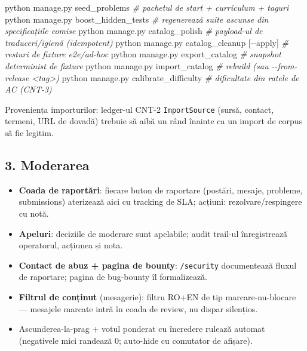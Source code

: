 \documentclass[
]{article}
\newenvironment{Shaded}{}{}
\newcommand{\CommentTok}[1]{\textcolor[rgb]{0.38,0.63,0.69}{\textit{#1}}}
\newcommand{\ExtensionTok}[1]{#1}
\newcommand{\NormalTok}[1]{#1}
\newcommand{\PreprocessorTok}[1]{\textcolor[rgb]{0.74,0.48,0.00}{#1}}
\newcommand{\SpecialStringTok}[1]{\textcolor[rgb]{0.73,0.40,0.53}{#1}}
\providecommand{\tightlist}{%
  \setlength{\itemsep}{0pt}\setlength{\parskip}{0pt}}
\begin{document}
\begin{Shaded}
\begin{Highlighting}[]
\ExtensionTok{python}\NormalTok{ manage.py seed\_problems            }\CommentTok{\# pachetul de start + curriculum + taguri}
\ExtensionTok{python}\NormalTok{ manage.py boost\_hidden\_tests       }\CommentTok{\# regenerează suite ascunse din specificațiile comise}
\ExtensionTok{python}\NormalTok{ manage.py catalog\_polish           }\CommentTok{\# payload{-}ul de traduceri/igienă (idempotent)}
\ExtensionTok{python}\NormalTok{ manage.py catalog\_cleanup }\PreprocessorTok{[{-}{-}}\SpecialStringTok{apply}\PreprocessorTok{]}  \CommentTok{\# resturi de fixture e2e/ad{-}hoc}
\ExtensionTok{python}\NormalTok{ manage.py export\_catalog           }\CommentTok{\# snapshot determinist de fixture}
\ExtensionTok{python}\NormalTok{ manage.py import\_catalog           }\CommentTok{\# rebuild (sau {-}{-}from{-}release \textless{}tag\textgreater{})}
\ExtensionTok{python}\NormalTok{ manage.py calibrate\_difficulty     }\CommentTok{\# dificultate din ratele de AC (CNT{-}3)}
\end{Highlighting}
\end{Shaded}

Proveniența importurilor: ledger-ul CNT-2 \texttt{ImportSource} (sursă,
contact, termeni, URL de dovadă) trebuie să aibă un rând înainte ca un
import de corpus să fie legitim.

\subsection{3. Moderarea}\label{3-moderarea}

\begin{itemize}
\tightlist
\item
  \textbf{Coada de raportări}: fiecare buton de raportare (postări,
  mesaje, probleme, submissions) aterizează aici cu tracking de SLA;
  acțiuni: rezolvare/respingere cu notă.
\item
  \textbf{Apeluri}: deciziile de moderare sunt apelabile; audit trail-ul
  înregistrează operatorul, acțiunea și nota.
\item
  \textbf{Contact de abuz + pagina de bounty}: \texttt{/security}
  documentează fluxul de raportare; pagina de bug-bounty îl
  formalizează.
\item
  \textbf{Filtrul de conținut} (mesagerie): filtru RO+EN de tip
  marcare-nu-blocare --- mesajele marcate intră în coada de review, nu
  dispar silențios.
\item
  Ascunderea-la-prag + votul ponderat cu încredere rulează automat
  (negativele mici randează 0; auto-hide cu comutator de afișare).
\end{itemize}
\end{document}
